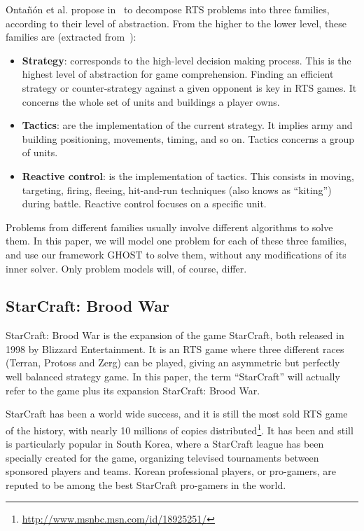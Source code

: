 \documentclass[journal]{IEEEtran}
\newcommand{\ghost}{\textsc{GHOST}\xspace}
\begin{document}
Onta{\~n}{\'o}n et  al. propose in~\cite{OntanonSURCM13}  to decompose
RTS  problems  into  three  families,  according  to  their  level  of
abstraction. From  the higher to  the lower level, these  families are
(extracted from~\cite{OntanonSURCM13}):
\begin{itemize}
\item {\bf  Strategy}: corresponds  to the high-level  decision making
  process.   This is  the highest  level of  abstraction for game
  comprehension.   Finding an  efficient strategy  or counter-strategy
  against a given opponent is key  in RTS games. It concerns the whole
  set of units and buildings a player owns.
\item {\bf Tactics}:  are the implementation of  the current strategy.
  It implies army and building  positioning, movements, timing, and so
  on. Tactics concerns a group of units.
\item {\bf Reactive  control}: is the implementation  of tactics. This
  consists   in  moving,   targeting,  firing,   fleeing,  hit-and-run
  techniques  (also  knows  as ``kiting'')  during  battle.   Reactive
  control focuses on a specific unit.
\end{itemize}
Problems from different families  usually involve different algorithms
to solve them.  In  this paper, we will model one  problem for each of
these three families,  and use our framework \ghost to  solve them, without
any modifications  of its inner  solver. Only  problem models  will, of
course, differ.

\subsection{StarCraft: Brood War}

StarCraft:  Brood War  is the  expansion of  the game  StarCraft, both
released in 1998  by Blizzard Entertainment.  It is an  RTS game where
three  different  races (Terran, Protoss and Zerg)  can be played,
giving an  asymmetric but perfectly  well balanced strategy  game.  In
this paper,  the term  ``StarCraft'' will actually  refer to  the game
plus its expansion StarCraft: Brood War.

StarCraft has  been a world wide  success, and it is still  the most sold
RTS game of the history, with nearly 10 millions of copies distributed\footnote{\url{http://www.msnbc.msn.com/id/18925251/}}. It has
been  and  still is  particularly  popular  in  South Korea,  where  a
StarCraft league has  been specially created for  the game, organizing
televised  tournaments between  sponsored players  and teams.   Korean
professional players, or pro-gamers, are  reputed to be among the best
StarCraft pro-gamers in the world.
\end{document}
